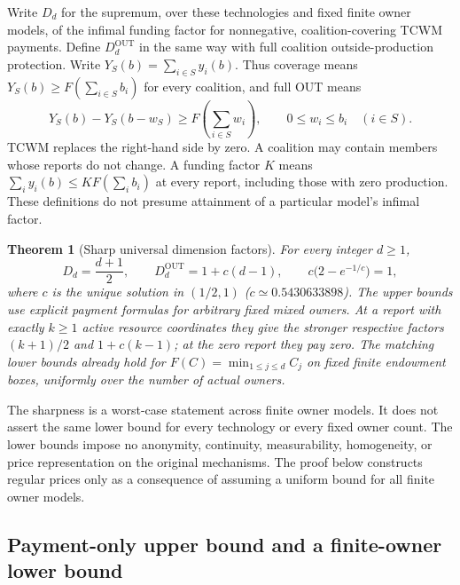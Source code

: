 \documentclass[11pt]{article}
\newtheorem{theorem}{Theorem}[section]
\theoremstyle{definition}\newtheorem{definition}[theorem]{Definition}
\theoremstyle{remark}\newtheorem{remark}[theorem]{Remark}
\begin{document}
Write $D_d$ for the supremum, over these technologies and fixed finite
owner models, of the infimal funding factor for nonnegative,
coalition-covering TCWM payments. Define $D_d^{\mathrm{OUT}}$ in the same
way with full coalition outside-production protection. Write $Y_S(b)=\sum_{i\in S}y_i(b)$. Thus coverage means
$Y_S(b)\ge F(\sum_{i\in S}b_i)$ for every coalition, and full OUT means
\begin{equation}\label{dim:out-contract}
 Y_S(b)-Y_S(b-w_S)\ge
 F\left(\sum_{i\in S}w_i\right),
 \qquad 0\le w_i\le b_i\quad(i\in S).
\end{equation}
TCWM replaces the right-hand side by zero. A coalition may contain members
whose reports do not change. A funding factor $K$ means
$\sum_i y_i(b)\le K F(\sum_i b_i)$ at every report, including those with
zero production. These definitions do not presume attainment of a
particular model's infimal factor.

\begin{theorem}[Sharp universal dimension factors]\label{dim:main}
For every integer $d\ge1$,
\begin{equation}\label{dim:frontiers}
 D_d=\frac{d+1}{2},\qquad
 D_d^{\mathrm{OUT}}=1+c(d-1),
 \qquad c\bigl(2-e^{-1/c}\bigr)=1,
\end{equation}
where $c$ is the unique solution in $(1/2,1)$
($c\simeq0.5430633898$).
The upper bounds use explicit payment formulas for arbitrary fixed mixed
owners. At a report with exactly $k\ge1$ active resource coordinates they
give the stronger respective factors $(k+1)/2$ and $1+c(k-1)$; at the zero
report they pay zero. The matching lower bounds already hold for
$F(C)=\min_{1\le j\le d}C_j$ on fixed finite endowment boxes, uniformly
over the number of actual owners.
\end{theorem}

The sharpness is a worst-case statement across finite owner models.
It does not assert the same lower bound for every technology or every fixed
owner count. The lower bounds impose no anonymity, continuity,
measurability, homogeneity, or price representation on the original
mechanisms. The proof below constructs regular prices only as a consequence
of assuming a uniform bound for all finite owner models.

\subsection{Payment-only upper bound and a finite-owner lower bound}
\end{document}
